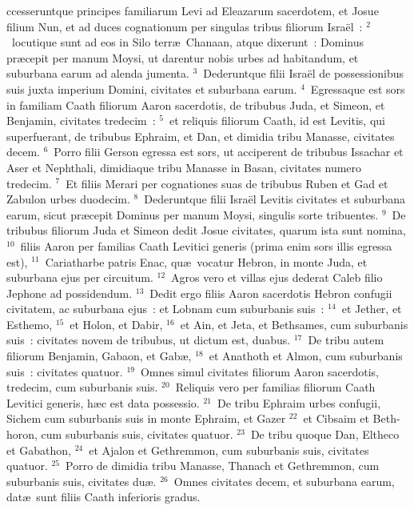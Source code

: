 \bchapter
{}ccesseruntque principes familiarum Levi ad Eleazarum sacerdotem, et Josue filium Nun, et ad duces cognationum per singulas tribus filiorum Isra\"el~:
${}^{2}$~locutique sunt ad eos in Silo terr\ae\ Chanaan, atque dixerunt~: Dominus pr\ae cepit per manum Moysi, ut darentur nobis urbes ad habitandum, et suburbana earum ad alenda jumenta.
${}^{3}$~Dederuntque filii Isra\"el de possessionibus suis juxta imperium Domini, civitates et suburbana earum.
${}^{4}$~Egressaque est sors in familiam Caath filiorum Aaron sacerdotis, de tribubus Juda, et Simeon, et Benjamin, civitates tredecim~:
${}^{5}$~et reliquis filiorum Caath, id est Levitis, qui superfuerant, de tribubus Ephraim, et Dan, et dimidia tribu Manasse, civitates decem.
${}^{6}$~Porro filii Gerson egressa est sors, ut acciperent de tribubus Issachar et Aser et Nephthali, dimidiaque tribu Manasse in Basan, civitates numero tredecim.
${}^{7}$~Et filiis Merari per cognationes suas de tribubus Ruben et Gad et Zabulon urbes duodecim.
${}^{8}$~Dederuntque filii Isra\"el Levitis civitates et suburbana earum, sicut pr\ae cepit Dominus per manum Moysi, singulis sorte tribuentes.
${}^{9}$~De tribubus filiorum Juda et Simeon dedit Josue civitates, quarum ista sunt nomina,
${}^{10}$~filiis Aaron per familias Caath Levitici generis (prima enim sors illis egressa est),
${}^{11}$~Cariatharbe patris Enac, qu\ae\ vocatur Hebron, in monte Juda, et suburbana ejus per circuitum.
${}^{12}$~Agros vero et villas ejus dederat Caleb filio Jephone ad possidendum.
${}^{13}$~Dedit ergo filiis Aaron sacerdotis Hebron confugii civitatem, ac suburbana ejus~: et Lobnam cum suburbanis suis~:
${}^{14}$~et Jether, et Esthemo,
${}^{15}$~et Holon, et Dabir,
${}^{16}$~et Ain, et Jeta, et Bethsames, cum suburbanis suis~: civitates novem de tribubus, ut dictum est, duabus.
${}^{17}$~De tribu autem filiorum Benjamin, Gabaon, et Gab\ae ,
${}^{18}$~et Anathoth et Almon, cum suburbanis suis~: civitates quatuor.
${}^{19}$~Omnes simul civitates filiorum Aaron sacerdotis, tredecim, cum suburbanis suis.
${}^{20}$~Reliquis vero per familias filiorum Caath Levitici generis, h\ae c est data possessio.
${}^{21}$~De tribu Ephraim urbes confugii, Sichem cum suburbanis suis in monte Ephraim, et Gazer
${}^{22}$~et Cibsaim et Beth-horon, cum suburbanis suis, civitates quatuor.
${}^{23}$~De tribu quoque Dan, Eltheco et Gabathon,
${}^{24}$~et Ajalon et Gethremmon, cum suburbanis suis, civitates quatuor.
${}^{25}$~Porro de dimidia tribu Manasse, Thanach et Gethremmon, cum suburbanis suis, civitates du\ae .
${}^{26}$~Omnes civitates decem, et suburbana earum, dat\ae\ sunt filiis Caath inferioris gradus.
